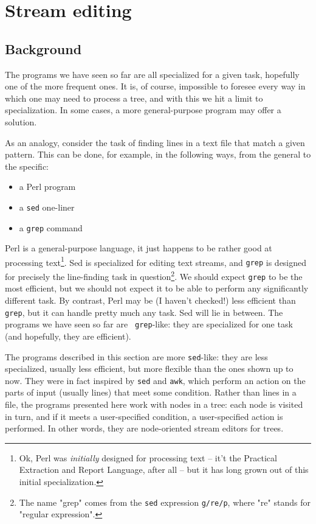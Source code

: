 \section{Stream editing}
\label{sct_ed}

\subsection{Background}

The programs we have seen so far are all specialized for a given task,
hopefully one of the more frequent ones. It is, of course, impossible to
foresee every way in which one may need to process a tree, and with this we hit
a limit to specialization. In some cases, a more general-purpose program may
offer a solution.

As an analogy, consider the task of finding lines in a text file that match a
given pattern. This can be done, for example, in the following ways, from the
general to the specific:
\begin{itemize}
	\item a Perl program
	\item a {\tt sed} one-liner
	\item a {\tt grep} command
\end{itemize}
Perl is a general-purpose language, it just happens to be rather good at
processing text\footnote{Ok, Perl was \emph{initially} designed for processing
text -- it't the Practical Extraction and Report Language, after all -- but it
has long grown out of this initial specialization.}. Sed is specialized for
editing text streams, and {\tt grep} is designed for precisely the line-finding
task in question\footnote{The name "grep" comes from the {\tt sed} expression
{\tt g/re/p}, where "re" stands for "regular expression".}. We should expect
{\tt grep} to be the most efficient, but we should not expect it to be able to
perform any significantly different task.  By contrast, Perl may be (I haven't
checked!) less efficient than {\tt grep}, but it can handle pretty much any
task. Sed will lie in between. The programs we have seen so far are {\tt
grep}-like: they are specialized for one task (and hopefully, they are
efficient).

The programs described in this section are more {\tt sed}-like: they are less
specialized, usually less efficient, but more flexible than the ones shown up to
now. They were in fact inspired by \texttt{sed} and \texttt{awk}, which perform
an action on the parts of input (usually lines) that meet some condition. Rather
than lines in a file, the programs presented here work with nodes in a tree:
each node is visited in turn, and if it meets a user-specified condition, a
user-specified action is performed. In other words, they are node-oriented
stream editors for trees.

